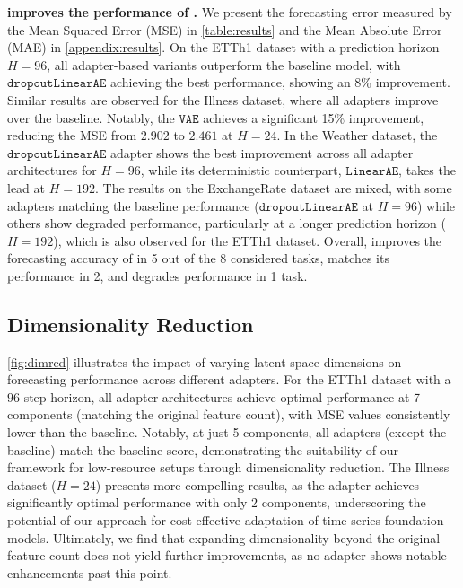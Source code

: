 \noindent\textbf{\adapts improves the performance of \moment.} We present the forecasting error measured by the Mean Squared Error (MSE) in \cref{table:results} and the Mean Absolute Error (MAE) in \cref{appendix:results}. On the ETTh1 dataset with a prediction horizon $H=96$, all adapter-based variants outperform the baseline \moment model, with $\texttt{dropoutLinearAE}$ achieving the best performance, showing an 8\% improvement. Similar results are observed for the Illness dataset, where all adapters improve over the baseline. Notably, the $\texttt{VAE}$ achieves a significant 15\% improvement, reducing the MSE from $2.902$ to $2.461$ at $H=24$. In the Weather dataset, the $\texttt{dropoutLinearAE}$ adapter shows the best improvement across all adapter architectures for $H=96$, while its deterministic counterpart, $\texttt{LinearAE}$, takes the lead at $H=192$. The results on the ExchangeRate dataset are mixed, with some adapters matching the baseline performance ($\texttt{dropoutLinearAE}$ at $H=96$) while others show degraded performance, particularly at a longer prediction horizon ($H=192$), which is also observed for the ETTh1 dataset. Overall, \adapts improves the forecasting accuracy of \moment in 5 out of the 8 considered tasks, matches its performance in 2, and degrades performance in 1 task.

\subsection{Dimensionality Reduction}

\cref{fig:dimred} illustrates the impact of varying latent space dimensions on forecasting performance across different adapters. For the ETTh1 dataset with a $96$-step horizon, all adapter architectures achieve optimal performance at 7 components (matching the original feature count), with MSE values consistently lower than the baseline. Notably, at just 5 components, all adapters (except the \pca baseline) match the baseline score, demonstrating the suitability of our framework for low-resource setups through dimensionality reduction. The Illness dataset ($H=24$) presents more compelling results, as the \vae adapter achieves significantly optimal performance with only 2 components, underscoring the potential of our approach for cost-effective adaptation of time series foundation models. Ultimately, we find that expanding dimensionality beyond the original feature count does not yield further improvements, as no adapter shows notable enhancements past this point.

